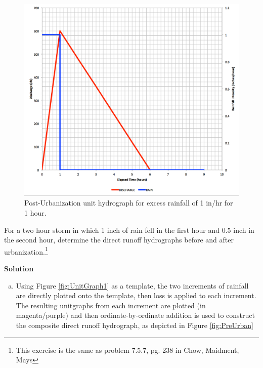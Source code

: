 \documentclass[12pt]{article}
\begin{document}
\begin{enumerate}
\begin{figure}[h!] %
   \centering
   \includegraphics[width=5in]{UnitGraph2.jpg} 
   \caption{Post-Urbanization unit hydrograph for excess rainfall of 1 in/hr for 1 hour.}
   \label{fig:UnitGraph2}
\end{figure}

For a two hour storm in which 1 inch of rain fell in the first hour and 0.5 inch in the second hour, determine the direct runoff hydrographs before and after urbanization.\footnote{This exercise is the same as problem 7.5.7, pg. 238 in Chow, Maidment, Mays}

\clearpage
\textbf{Solution}

\begin{enumerate}[a)]

\item Using Figure \ref{fig:UnitGraph1} as a template, the two increments of rainfall are directly plotted onto the template, then loss is applied to each increment.  The resulting unitgraphs from each increment are plotted (in magenta/purple) and then ordinate-by-ordinate addition is used to construct the composite direct runoff hydrograph, as depicted in Figure \ref{fig:PreUrban}


\end{enumerate}
\end{enumerate}
\end{document}

